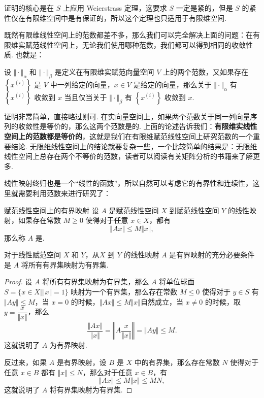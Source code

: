 证明的核心是在 $S$ 上应用 Weierstrass 定理，这要求 $S$ 一定是紧的，但是 $S$ 的紧性仅在有限维空间中是有保证的，所以这个定理也只适用于有限维空间.

既然有限维线性空间上的范数都差不多，那么我们可以完全解决上面的问题：在有限维实赋范线性空间上，无论我们使用哪种范数，我们都可以得到相同的收敛性质. 也就是：

\begin{corollary}{}{}
    设 $\Vert \cdot\Vert_\alpha$ 和 $\Vert \cdot\Vert_\beta$ 是定义在有限维实赋范向量空间 $V$ 上的两个范数，又如果存在 $\left\{x^{(i)}\right\}$ 是 $V$ 中一列给定的向量，$x\in V$ 是给定的向量，那么关于 $\Vert \cdot\Vert_\alpha$ 有 $\left\{x^{(i)}\right\}$ 收敛到 $x$ 当且仅当关于 $\Vert \cdot\Vert_\beta$ 有 $\left\{x^{(i)}\right\}$ 收敛到 $x$.
\end{corollary}

证明非常简单，直接略过则可. 在实向量空间上，如果两个范数关于同一列向量序列的收敛性是等价的，那么这两个范数是的. 上面的论述告诉我们：\textbf{有限维实线性空间上的范数都是等价的}，这就是我们在有限维赋范线性空间上研究范数的一个重要结论. 无限维线性空间上的结论就要复杂一些，一个比较简单的结果是：无限维线性空间上总存在两个不等价的范数，读者可以阅读有关矩阵分析的书籍来了解更多.

线性映射终归也是一个``线性的函数''，所以自然可以考虑它的有界性和连续性，这里就需要利用范数来进行研究了：

\begin{definition}{赋范线性空间上的有界映射}{}
    设 $A$ 是赋范线性空间 $X$ 到赋范线性空间 $Y$ 的线性映射，如果存在常数 $M\geqslant 0$ 使得对于任意 $x\in X$，都有 \[\Vert Ax\Vert\leqslant M\Vert x\Vert,\]
    那么称 $A$ 是.
\end{definition}

\begin{theorem}{}{}
    对于线性赋范空间 $X$ 和 $Y$，从$X$ 到 $Y$ 的线性映射 $A$ 是有界映射的充分必要条件是 $A$ 将所有有界集映射为有界集.
\end{theorem}

\begin{proof}
    设 $A$ 将所有有界集映射为有界集，那么 $A$ 将单位球面 $S=\{x\in X \mid \Vert x\Vert=1\}$ 映射为一个有界集，那么存在常数 $M\leqslant 0$ 使得对于 $y\in S$ 有 $\Vert Ay\Vert\leqslant M$，当 $x = 0$ 的时候，$\Vert Ax\Vert \leqslant M\Vert x\Vert$自然成立，当 $x \neq 0$ 的时候，取 $y=\dfrac{x}{\Vert x\Vert}$，那么 \[\frac{\Vert Ax\Vert}{\Vert x\Vert} = \left\Vert A\frac{x}{\Vert x\Vert}\right\Vert = \Vert Ay\Vert \leqslant M.\] 这就说明了 $A$ 为有界映射.

    反过来，如果 $A$ 是有界映射，设 $B$ 是 $X$ 中的有界集，那么存在常数 $N$ 使得对于任意 $x\in B$ 都有 $\Vert x\Vert\leqslant N$，那么对于任意 $x\in B$，有 \[\Vert Ax\Vert\leqslant M\Vert x\Vert\leqslant MN,\]这就说明了 $A$ 将有界集映射为有界集.
\end{proof}

